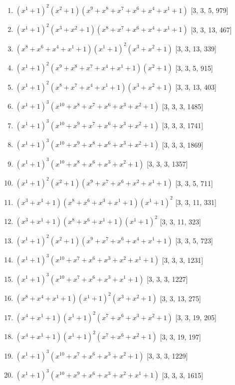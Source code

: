 \documentclass[10pt,twocolumn]{article}
\begin{document}
\begin{enumerate}
\item $(x^{1} + 1)^{2}(x^{2} + 1)(x^{9} + x^{8} + x^{7} + x^{6} + x^{4} + x^{1} + 1)$  [3, 3, 5, 979]
\item $(x^{1} + 1)^{2}(x^{3} + x^{2} + 1)(x^{8} + x^{7} + x^{6} + x^{4} + x^{1} + 1)$  [3, 3, 13, 467]
\item $(x^{8} + x^{6} + x^{4} + x^{1} + 1)(x^{1} + 1)^{2}(x^{3} + x^{2} + 1)$  [3, 3, 13, 339]
\item $(x^{1} + 1)^{2}(x^{9} + x^{8} + x^{7} + x^{4} + x^{1} + 1)(x^{2} + 1)$  [3, 3, 5, 915]
\item $(x^{1} + 1)^{2}(x^{8} + x^{7} + x^{4} + x^{1} + 1)(x^{3} + x^{2} + 1)$  [3, 3, 13, 403]
\item $(x^{1} + 1)^{3}(x^{10} + x^{8} + x^{7} + x^{6} + x^{3} + x^{2} + 1)$  [3, 3, 3, 1485]
\item $(x^{1} + 1)^{3}(x^{10} + x^{9} + x^{7} + x^{6} + x^{3} + x^{2} + 1)$  [3, 3, 3, 1741]
\item $(x^{1} + 1)^{3}(x^{10} + x^{9} + x^{8} + x^{6} + x^{3} + x^{2} + 1)$  [3, 3, 3, 1869]
\item $(x^{1} + 1)^{3}(x^{10} + x^{8} + x^{6} + x^{3} + x^{2} + 1)$  [3, 3, 3, 1357]
\item $(x^{1} + 1)^{2}(x^{2} + 1)(x^{9} + x^{7} + x^{6} + x^{2} + x^{1} + 1)$  [3, 3, 5, 711]
\item $(x^{3} + x^{1} + 1)(x^{8} + x^{6} + x^{3} + x^{1} + 1)(x^{1} + 1)^{2}$  [3, 3, 11, 331]
\item $(x^{3} + x^{1} + 1)(x^{8} + x^{6} + x^{1} + 1)(x^{1} + 1)^{2}$  [3, 3, 11, 323]
\item $(x^{1} + 1)^{2}(x^{2} + 1)(x^{9} + x^{7} + x^{6} + x^{4} + x^{1} + 1)$  [3, 3, 5, 723]
\item $(x^{1} + 1)^{3}(x^{10} + x^{7} + x^{6} + x^{3} + x^{2} + x^{1} + 1)$  [3, 3, 3, 1231]
\item $(x^{1} + 1)^{3}(x^{10} + x^{7} + x^{6} + x^{3} + x^{1} + 1)$  [3, 3, 3, 1227]
\item $(x^{8} + x^{4} + x^{1} + 1)(x^{1} + 1)^{2}(x^{3} + x^{2} + 1)$  [3, 3, 13, 275]
\item $(x^{4} + x^{1} + 1)(x^{1} + 1)^{2}(x^{7} + x^{6} + x^{3} + x^{2} + 1)$  [3, 3, 19, 205]
\item $(x^{4} + x^{1} + 1)(x^{1} + 1)^{2}(x^{7} + x^{6} + x^{2} + 1)$  [3, 3, 19, 197]
\item $(x^{1} + 1)^{3}(x^{10} + x^{7} + x^{6} + x^{3} + x^{2} + 1)$  [3, 3, 3, 1229]
\item $(x^{1} + 1)^{3}(x^{10} + x^{9} + x^{6} + x^{3} + x^{2} + x^{1} + 1)$  [3, 3, 3, 1615]

\end{enumerate}
\end{document}
